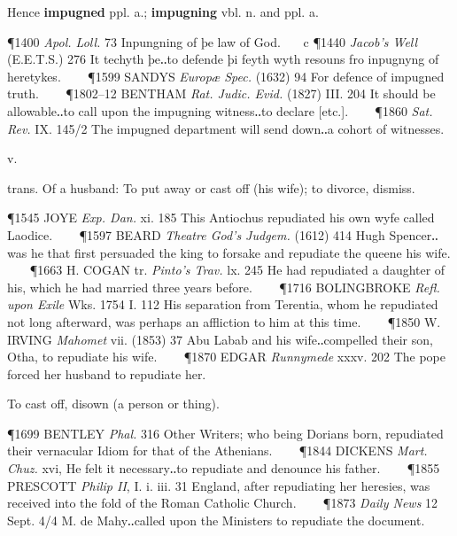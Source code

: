 \begin{description}[wide, labelwidth=!, labelindent=0pt]
\begin{myenumerate}
\noindent Hence \textbf{impugned} ppl. a.; \textbf{impugning} vbl. n. and ppl. a.

\P 1400  \textit{Apol. Loll.} 73 Inpungning of þe law of God.    c 
\P 1440 \textit{Jacob's  Well} (E.E.T.S.) 276 It techyth þe‥to defende þi feyth wyth resouns fro inpugnyng of heretykes.    
\P 1599 SANDYS  \textit{Europæ Spec.} (1632) 94 For defence of impugned truth.    
\P 1802–12 BENTHAM \textit{Rat. Judic. Evid.} (1827) III. 204 It should be allowable‥to call upon the impugning witness‥to declare [etc.].    
\P 1860  \textit{Sat. Rev.} IX. 145/2 The impugned department will send down‥a cohort of witnesses.
\end{myenumerate}

 v.

\noindent {}

\vspace{-0.3cm}

\begin{myenumerate}

 trans.  Of a husband: To put away or cast off (his wife); to divorce, dismiss.

\P 1545 JOYE  \textit{Exp. Dan.} xi. 185 This Antiochus repudiated his own wyfe called Laodice.    
\P 1597 BEARD  \textit{Theatre God's Judgem.} (1612) 414 Hugh Spencer‥was he that first persuaded the king to forsake and repudiate the queene his wife.    
\P 1663 H. COGAN tr. \textit{Pinto's Trav.} lx. 245 He had repudiated a daughter of his, which he had married three years before.    
\P 1716 BOLINGBROKE  \textit{Refl. upon Exile} Wks. 1754 I. 112  His separation from Terentia, whom he repudiated not long afterward, was perhaps an affliction to him at this time.    
\P 1850 W. IRVING  \textit{Mahomet} vii. (1853) 37 Abu Labab and his wife‥compelled their son, Otha, to repudiate his wife.    
\P 1870 EDGAR  \textit{Runnymede} xxxv. 202 The pope forced her husband to repudiate her.

 To cast off, disown (a person or thing).

\P 1699 BENTLEY  \textit{Phal.} 316 Other Writers; who being Dorians born, repudiated their vernacular Idiom for that of the Athenians.    
\P 1844 DICKENS  \textit{Mart. Chuz.} xvi, He felt it necessary‥to repudiate and denounce his father.    
\P 1855 PRESCOTT  \textit{Philip II}, I. i. iii. 31 England, after repudiating her heresies, was received into the fold of the Roman Catholic Church.    
\P 1873  \textit{Daily News} 12 Sept. 4/4 M. de Mahy‥called upon the Ministers to repudiate the document.


\end{myenumerate}
\end{description}
